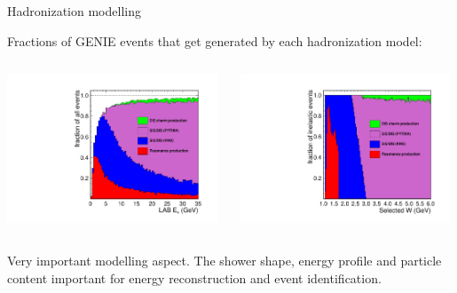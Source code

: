 \begin{frame}{Hadronization modelling}

Fractions of GENIE events that get generated by each hadronization model:\\

\begin{columns}[T]
  \begin{column}{0.50\textwidth}
     \includegraphics[width=0.98\textwidth]{./images/nuint/dis/hadrofracE.pdf}
  \end{column}
  \begin{column}{0.50\textwidth}
     \includegraphics[width=0.98\textwidth]{./images/nuint/dis/hadrofracW.pdf}
  \end{column}
\end{columns}
{\scriptsize
 Very important modelling aspect. The shower shape, energy profile and particle
 content important for energy reconstruction and event identification.
}
\end{frame}


